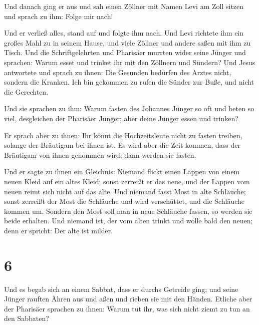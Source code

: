  Und danach ging er aus und sah einen Zöllner mit Namen
Levi am Zoll sitzen und sprach zu ihm: Folge mir nach!

 Und er verließ alles, stand auf und folgte ihm nach.
 Und Levi richtete ihm ein großes Mahl zu in seinem
Hause, und viele Zöllner und andere saßen mit ihm zu Tisch.
 Und die Schriftgelehrten und Pharisäer murrten wider
seine Jünger und sprachen: Warum esset und trinket ihr mit den Zöllnern
und Sündern?  Und Jesus antwortete und sprach zu ihnen:
Die Gesunden bedürfen des Arztes nicht, sondern die Kranken.
 Ich bin gekommen zu rufen die Sünder zur Buße, und nicht
die Gerechten.

 Und sie sprachen zu ihm: Warum fasten des Johannes
Jünger so oft und beten so viel, desgleichen der Pharisäer Jünger; aber
deine Jünger essen und trinken?

 Er sprach aber zu ihnen: Ihr könnt die Hochzeitsleute
nicht zu fasten treiben, solange der Bräutigam bei ihnen ist.
 Es wird aber die Zeit kommen, dass der Bräutigam von
ihnen genommen wird; dann werden sie fasten.

 Und er sagte zu ihnen ein Gleichnis: Niemand flickt
einen Lappen von einem neuen Kleid auf ein altes Kleid; sonst zerreißt
er das neue, und der Lappen vom neuen reimt sich nicht auf das alte.
 Und niemand fasst Most in alte Schläuche; sonst zerreißt
der Most die Schläuche und wird verschüttet, und die Schläuche kommen
um.  Sondern den Most soll man in neue Schläuche fassen,
so werden sie beide erhalten.  Und niemand ist, der vom
alten trinkt und wolle bald den neuen; denn er spricht: Der alte ist
milder.

\hypertarget{section-5}{%
\section{6}\label{section-5}}

 Und es begab sich an einem Sabbat, dass er durchs
Getreide ging; und seine Jünger rauften Ähren aus und aßen und rieben
sie mit den Händen.  Etliche aber der Pharisäer sprachen
zu ihnen: Warum tut ihr, was sich nicht ziemt zu tun an den Sabbaten?

